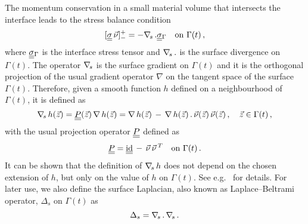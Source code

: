 The momentum conservation in a small material volume that intersects the
interface leads to the stress balance condition
\begin{equation}\label{eq:interface_jump_stress_div}
[\mat\sigma\,\vec \nu]_-^+ = -\nabs\,.\mat\sigma_{\Gamma} \quad \mbox{on }
\Gamma(t)\,,
\end{equation}
where $\mat\sigma_{\Gamma}$ is the interface stress tensor and $\nabla_{\!s}\,.$ is
the surface divergence on $\Gamma(t)$. The operator $\nabla_{\!s}$ is the surface
gradient on $\Gamma(t)$ and it is the orthogonal projection of the usual
gradient operator $\nabla$ on the tangent space of the surface $\Gamma(t)$.
Therefore, given a smooth function $h$ defined on a neighbourhood of
$\Gamma(t)$, it is defined as
\begin{equation}\label{eq:surface_gradient}
\nabs\,h(\vec z)=\mat P(\vec z)\,\nabla\,h(\vec z)=\nabla\,h(\vec z)\,-
\,\nabla\,h(\vec z)\,.\,\vec\nu(\vec z)\,\vec\nu(\vec z)\,,\quad \vec z
\in\Gamma(t)\,,
\end{equation}
with the usual projection operator $\mat P$ defined as
\begin{equation}\label{eq:surface_projection}
\mat P=\mat\id\,-\,\vec\nu\,\vec\nu\,^T\quad \mbox{on } \Gamma(t)\,.
\end{equation}
It can be shown that the definition of $\nabla_{\!s}\,h$ does not depend on the chosen
extension of $h$, but only on the value of $h$ on $\Gamma(t)$. See e.g.\
\cite[\S2.1]{DeckelnickDE05} for details. 
For later use, we also define the surface
Laplacian, also known as Laplace--Beltrami operator, $\Delta_s$ on $\Gamma(t)$
as
\begin{equation}\label{eq:surface_laplacian}
\Delta_s = \nabla_{\!s}\,.\,\nabla_{\!s}\,.
\end{equation}

